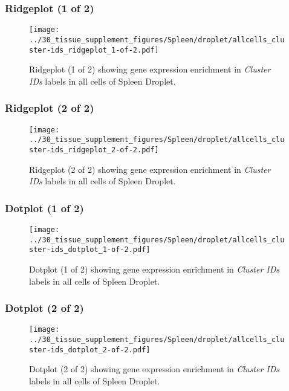 \clearpage

\subsubsection{Ridgeplot (1 of 2)}
\begin{figure}[h]
\centering
\texttt{[image: ../30\_tissue\_supplement\_figures/Spleen/droplet/allcells\_cluster-ids\_ridgeplot\_1-of-2.pdf]}

\caption{ Ridgeplot (1 of 2)  showing gene expression enrichment in \emph{Cluster IDs} labels in all cells of Spleen Droplet. }
\end{figure}


\clearpage

\subsubsection{Ridgeplot (2 of 2)}
\begin{figure}[h]
\centering
\texttt{[image: ../30\_tissue\_supplement\_figures/Spleen/droplet/allcells\_cluster-ids\_ridgeplot\_2-of-2.pdf]}

\caption{ Ridgeplot (2 of 2)  showing gene expression enrichment in \emph{Cluster IDs} labels in all cells of Spleen Droplet. }
\end{figure}


\clearpage

\subsubsection{Dotplot (1 of 2)}
\begin{figure}[h]
\centering
\texttt{[image: ../30\_tissue\_supplement\_figures/Spleen/droplet/allcells\_cluster-ids\_dotplot\_1-of-2.pdf]}

\caption{ Dotplot (1 of 2)  showing gene expression enrichment in \emph{Cluster IDs} labels in all cells of Spleen Droplet. }
\end{figure}


\clearpage

\subsubsection{Dotplot (2 of 2)}
\begin{figure}[h]
\centering
\texttt{[image: ../30\_tissue\_supplement\_figures/Spleen/droplet/allcells\_cluster-ids\_dotplot\_2-of-2.pdf]}

\caption{ Dotplot (2 of 2)  showing gene expression enrichment in \emph{Cluster IDs} labels in all cells of Spleen Droplet. }
\end{figure}


